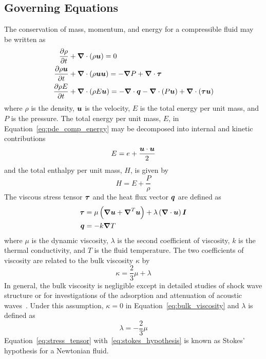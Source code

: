 \subsection{Governing Equations}
The conservation of mass, momentum, and energy for a compressible fluid may be written as
\begin{align}
  \label{eq:pde_comp_mass}
  {\frac{\partial{\rho}}{\partial{t}}} &+ {\boldsymbol{\nabla}} {}\cdot \left(\rho{\boldsymbol{u}}\right) = 0 \\
  \label{eq:pde_comp_mom}
  {\frac{\partial{\rho{\boldsymbol{u}}}}{\partial{t}}} &+ {\boldsymbol{\nabla}} {}\cdot\left(\rho{\boldsymbol{u}}{\boldsymbol{u}}\right) =
    -{\boldsymbol{\nabla}} {P} + {\boldsymbol{\nabla}} {}\cdot{\boldsymbol{\tau}} \\
  \label{eq:pde_comp_energy}
  {\frac{\partial{\rho E}}{\partial{t}}} &+ {\boldsymbol{\nabla}} {}\cdot\left(\rho E {\boldsymbol{u}}\right) =
    -{\boldsymbol{\nabla}} {}\cdot{\boldsymbol{q}} - {\boldsymbol{\nabla}} {}\cdot\left(P{\boldsymbol{u}}\right) + {\boldsymbol{\nabla}} {}\cdot\left({\boldsymbol{\tau}}{\boldsymbol{u}}\right)  
\end{align}
where $\rho$ is the density, ${\boldsymbol{u}}$ is the velocity, $E$ is the total energy per unit mass, and $P$ is the pressure.  The total energy per unit mass, $E$, in Equation~\eqref{eq:pde_comp_energy} may be decomposed into internal and kinetic contributions
\begin{equation}
  \label{eq:total_energy}
  E = e + \frac{{\boldsymbol{u}}\cdot{\boldsymbol{u}}}{2} 
\end{equation}
 and the total enthalpy per unit mass, $H$, is given by
 \begin{equation}
   \label{eq:total_enthalpy}
   H = E + \frac{P}{\rho}
 \end{equation} 
The viscous stress tensor ${\boldsymbol{\tau}}$ and the heat flux vector ${\boldsymbol{q}}$ are defined as
\begin{align}
  \label{eq:stress_tensor}
  {\boldsymbol{\tau}} &= \mu\left({\boldsymbol{\nabla}} {{\boldsymbol{u}}} + {\boldsymbol{\nabla}}^T {{\boldsymbol{u}}}\right) + \lambda \left({\boldsymbol{\nabla}} {}\cdot{\boldsymbol{u}}\right){\boldsymbol{I}} \\
  \label{eq:fouriers_law}
  {\boldsymbol{q}} &= -k{\boldsymbol{\nabla}} {T}
\end{align}
where $\mu$ is the dynamic viscosity, $\lambda$ is the second coefficient of viscosity, $k$ is the thermal conductivity, and $T$ is the fluid temperature.  The two coefficients of viscosity are related to the bulk viscosity $\kappa$ by
\begin{equation}
  \label{eq:bulk_viscosity}
  \kappa = \frac{2}{3} \mu + \lambda
\end{equation}
In general, the bulk viscosity is negligible except in detailed studies of shock wave structure or for investigations of the adsorption and attenuation of acoustic waves~\cite{panton_incompressible_flow}. Under this assumption, $\kappa=0$ in Equation~\eqref{eq:bulk_viscosity} and $\lambda$ is defined as
\begin{equation}
  \label{eq:stokes_hypothesis}
  \lambda = -\frac{2}{3} \mu
\end{equation}
Equation~\eqref{eq:stress_tensor} with~\eqref{eq:stokes_hypothesis} is known as Stokes' hypothesis for a Newtonian fluid.





